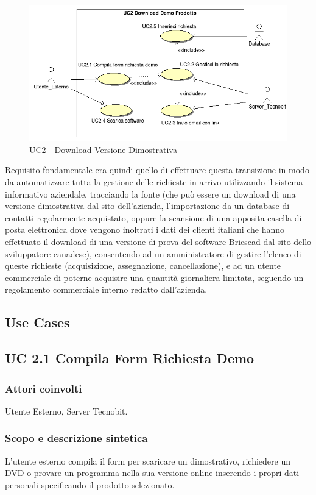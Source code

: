 \begin{figure}[!ht]
\centering
 \includegraphics[scale=0.7]{./images/UC2_download.png}
\caption{UC2 - Download Versione Dimostrativa}
\end{figure}

\noindent
Requisito fondamentale era quindi quello di effettuare questa transizione in modo da automatizzare tutta la gestione delle richieste in arrivo utilizzando il sistema informativo aziendale, tracciando la fonte (che pu\`o essere un download di una versione dimostrativa dal sito dell'azienda, l'importazione da un database di contatti regolarmente acquistato, oppure la scansione di una apposita casella di posta elettronica dove vengono inoltrati i dati dei clienti italiani che hanno effettuato il download di una versione di prova del software Bricscad dal sito dello sviluppatore canadese), consentendo ad un amministratore di gestire l'elenco di queste richieste (acquisizione, assegnazione, cancellazione), e ad un utente commerciale di poterne acquisire una quantit\`a giornaliera limitata, seguendo un regolamento commerciale interno redatto dall'azienda.
\subsection{Use Cases}

\subsection*{UC 2.1 Compila Form Richiesta Demo}
\subsubsection*{Attori coinvolti} Utente Esterno, Server Tecnobit.
\subsubsection*{Scopo e descrizione sintetica}
L'utente esterno compila il form per scaricare un dimostrativo, richiedere un DVD o provare un programma nella sua versione online inserendo i propri dati personali specificando il prodotto selezionato.
